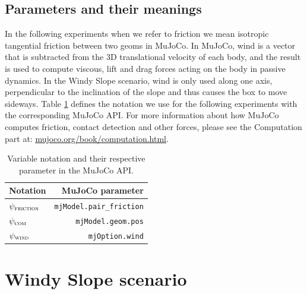 \subsection{Parameters and their meanings}
In the following experiments when we refer to friction we mean isotropic tangential friction between two geoms in MuJoCo. In MuJoCo, wind is a vector that is subtracted from the 3D translational velocity of each body, and the result is used to compute viscous, lift and drag forces acting on the body in passive dynamics. In the Windy Slope scenario, wind is only used along one axis, perpendicular to the inclination of the slope and thus causes the box to move sideways. Table \ref{table:mujoco_parameters} defines the notation we use for the following experiments with the corresponding MuJoCo API. For more information about how MuJoCo computes friction, contact detection and other forces, please see the Computation part at: \url{mujoco.org/book/computation.html}.

\begin{table}
\centering

\begin{tabular}{lr}
\toprule
Notation & MuJoCo parameter \\
\midrule
$\psi_{\textsc{friction}}{}$ & \texttt{mjModel.pair\_friction} \\
$\psi_{\textsc{com}}$ & \texttt{mjModel.geom.pos} \\
$\psi_{\textsc{wind}}$ & \texttt{mjOption.wind} \\
\bottomrule
\end{tabular}
\caption{Variable notation and their respective parameter in the MuJoCo API.}
\label{table:mujoco_parameters}
\end{table}


\section{Windy Slope scenario}
\label{windyslope}

